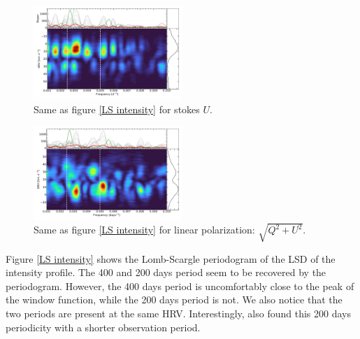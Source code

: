\documentclass{aa}
\begin{document}
\begin{figure}[!h]
    \centering
    \includegraphics[width=0.5\textwidth]{Lomb-Scargle Stokes U.pdf}
    \caption{Same as figure \ref{LS intensity} for stokes $U$.}
    \label{LS U}
\end{figure}


\begin{figure}[!h]
    \centering
    \includegraphics[width=0.5\textwidth]{Lomb-Scargle linear polarization.pdf}
    \caption{Same as figure \ref{LS intensity} for linear polarization: $\sqrt{Q^2+U^2}$.}
    \label{LS linear polarization}
\end{figure}




Figure \ref{LS intensity} shows the Lomb-Scargle periodogram of the LSD of the intensity profile. The 400 and 200 days period seem to be recovered by the periodogram. However, the 400 days period is uncomfortably close to the peak of the window function, while the 200 days period is not. We also notice that the two periods are present at the same HRV. Interestingly, \cite{mathias_evolution_2018} also found this 200 days periodicity with a shorter observation period. 
\end{document}

